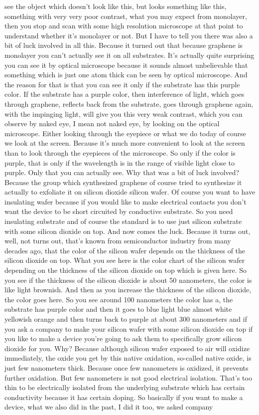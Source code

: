 see the object which doesn't look like this, but looks something like this, something with very very poor contrast, what you may expect from monolayer, then you stop and scan with some high resolution microscope at that point to understand whether it's monolayer or not. But I have to tell you there was also a bit of luck involved in all this. Because it turned out that because graphene is monolayer you can't actually see it on all substrates. It's actually quite surprising you can see it by optical microscope because it sounds almost unbelievable that something which is just one atom thick can be seen by optical microscope. And the reason for that is that you can see it only if the substrate has this purple color. If the substrate has a purple color, then interference of light, which goes through graphene, reflects back from the substrate, goes through graphene again, with the impinging light, will give you this very weak contrast, which you can observe by naked eye, I mean not naked eye, by looking on the optical microscope. Either looking through the eyepiece or what we do today of course we look at the screen. Because it's much more convenient to look at the screen than to look through the eyepieces of the microscope. So only if the color is purple, that is only if the wavelength is in the range of visible light close to purple. Only that you can actually see. Why that was a bit of luck involved? Because the group which synthesized graphene of course tried to synthesize it actually to exfoliate it on silicon dioxide silicon wafer. Of course you want to have insulating wafer because if you would like to make electrical contacts you don't want the device to be short circuited by conductive substrate. So you need insulating substrate and of course the standard is to use just silicon substrate with some silicon dioxide on top. And now comes the luck. Because it turns out, well, not turns out, that's known from semiconductor industry from many decades ago, that the color of the silicon wafer depends on the thickness of the silicon dioxide on top. What you see here is the color chart of the silicon wafer depending on the thickness of the silicon dioxide on top which is given here. So you see if the thickness of the silicon dioxide is about 50 nanometers, the color is like light brownish. And then as you increase the thickness of the silicon dioxide, the color goes here. So you see around 100 nanometers the color has a, the substrate has purple color and then it goes to blue light blue almost white yellowish orange and then turns back to purple at about 300 nanometers and if you ask a company to make your silicon wafer with some silicon dioxide on top if you like to make a device you're going to ask them to specifically grow silicon dioxide for you. Why? Because although silicon wafer exposed to air will oxidize immediately, the oxide you get by this native oxidation, so-called native oxide, is just few nanometers thick. Because once few nanometers is oxidized, it prevents further oxidation. But few nanometers is not good electrical isolation. That's too thin to be electrically isolated from the underlying substrate which has certain conductivity because it has certain doping. So basically if you want to make a device, what we also did in the past, I did it too, we asked company 